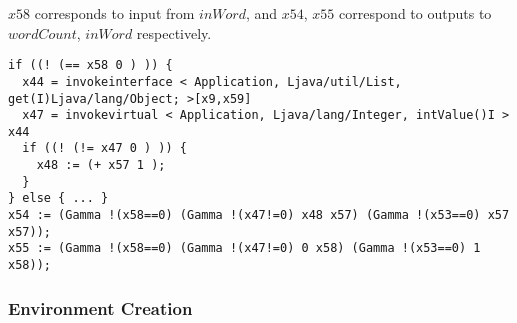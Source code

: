 $x58$ corresponds to input from $inWord$, and $x54$, $x55$ correspond to outputs to $wordCount$,
$inWord$ respectively.\\
%
\begin{lstlisting}
if ((! (== x58 0 ) )) {
  x44 = invokeinterface < Application, Ljava/util/List, get(I)Ljava/lang/Object; >[x9,x59]
  x47 = invokevirtual < Application, Ljava/lang/Integer, intValue()I > x44
  if ((! (!= x47 0 ) )) {
    x48 := (+ x57 1 );
  }
} else { ... }
x54 := (Gamma !(x58==0) (Gamma !(x47!=0) x48 x57) (Gamma !(x53==0) x57 x57));
x55 := (Gamma !(x58==0) (Gamma !(x47!=0) 0 x58) (Gamma !(x53==0) 1 x58));

\end{lstlisting}
\subsubsection{Environment Creation}


